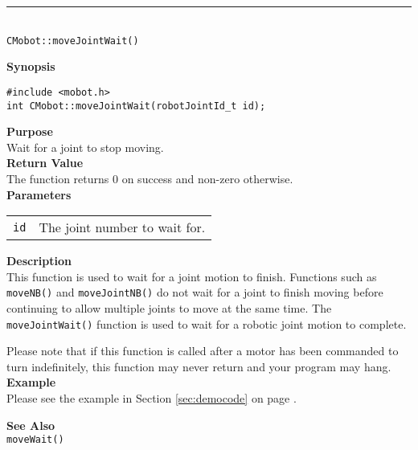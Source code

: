 \noindent
\vspace{5pt}
\rule{4.5in}{0.015in}\\
\noindent
{\LARGE \texttt{CMobot::moveJointWait()}}\\
{}

\noindent
{\bf Synopsis}
\vspace{-8pt}
\begin{verbatim}
#include <mobot.h>
int CMobot::moveJointWait(robotJointId_t id);
\end{verbatim}

\noindent
{\bf Purpose}\\
Wait for a joint to stop moving.\\

\noindent
{\bf Return Value}\\
The function returns 0 on success and non-zero otherwise.\\

\noindent
{\bf Parameters}
\vspace{-0.1in}
\begin{description}
\item               
\begin{tabular}{p{10 mm}p{145 mm}}
\texttt{id} & The joint number to wait for. \\
\end{tabular}
\end{description}

\noindent
{\bf Description}\\
This function is used to wait for a joint motion to finish. Functions such as
\texttt{moveNB()} and \texttt{moveJointNB()} do not wait for a joint to finish
moving before continuing to allow multiple joints to move at the same time. The
\texttt{moveJointWait()} function is used to wait for a 
robotic joint motion to complete.

Please note that if this function is called after a motor has been commanded to
turn indefinitely, this function may never return and your program may hang.\\

\noindent
{\bf Example}\\
Please see the example in Section \ref{sec:democode} on page \pageref{sec:democode}.\\
\noindent

\noindent
{\bf See Also}\\
\texttt{moveWait()}

